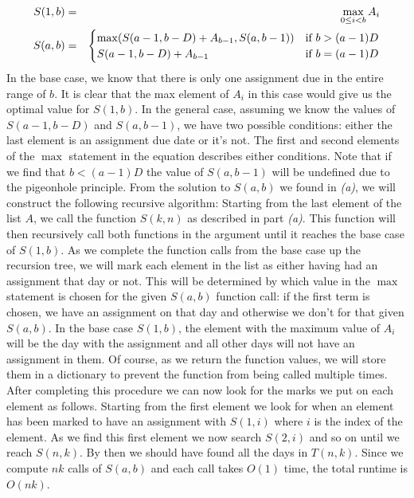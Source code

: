 \documentclass[12pt,twoside]{article}
\begin{document}
\begin{problems}
\begin{problemparts}
\begin{eqnarray*}
S(1,b) &=& \max\limits_{0 \leq i < b} A_i\\
S(a,b) &=& \left\{\def\arraystretch{1.2}%
  \begin{array}{@{}l@{\quad}l@{}}
    \max(S(a-1, b-D) + A_{b-1}, S(a,b-1)) & \text{if } b > (a-1)D\\
    S(a-1, b-D) + A_{b-1} & \text{if } b = (a-1)D\\
  \end{array}\right.\\
\end{eqnarray*}
In the base case, we know that there is only one assignment due in the entire range of $b$. It is clear that the max element of $A_i$ in this case would give us the optimal value for $S(1,b)$. In the general case, assuming we know the values of $S(a-1, b-D)$ and $S(a,b-1)$, we have two possible conditions: either the last element is an assignment due date or it's not. The first and second elements of the $\max$ statement in the equation describes either conditions. Note that if we find that $b < (a-1)D$ the value of $S(a,b-1)$ will be undefined due to the pigeonhole principle.
\problempart  %
From the solution to $S(a,b)$ we found in \emph{(a)}, we will construct the following recursive algorithm: Starting from the last element of the list $A$, we call the function $S(k,n)$ as described in part \emph{(a)}. This function will then recursively call both functions in the argument until it reaches the base case of $S(1,b)$. As we complete the function calls from the base case up the recursion tree, we will mark each element in the list as either having had an assignment that day or not. This will be determined by which value in the $\max$ statement is chosen for the given $S(a,b)$ function call: if the first term is chosen, we have an assignment on that day and otherwise we don't for that given $S(a,b)$. In the base case $S(1,b)$, the element with the maximum value of $A_i$ will be the day with the assignment and all other days will not have an assignment in them. Of course, as we return the function values, we will store them in a dictionary to prevent the function from being called multiple times. After completing this procedure we can now look for the marks we put on each element as follows. Starting from the first element we look for when an element has been marked to have an assignment with $S(1,i)$ where $i$ is the index of the element. As we find this first element we now search $S(2,i)$ and so on until we reach $S(n,k)$. By then we should have found all the days in $T(n,k)$. Since we compute $nk$ calls of $S(a,b)$ and each call takes $O(1)$ time, the total runtime is $O(nk)$.
\end{problemparts}


\end{problems}
\end{document}
